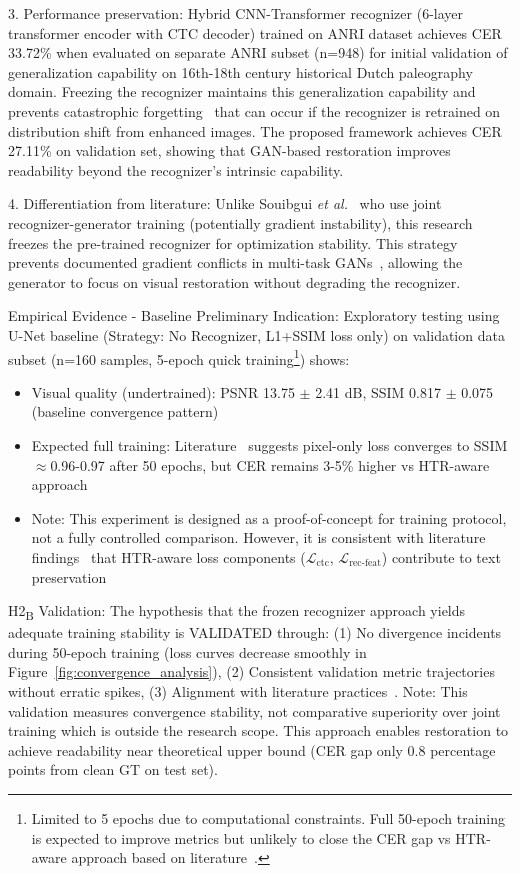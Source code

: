 \documentclass[journal]{IEEEtran}
\begin{document}
3. Performance preservation: Hybrid CNN-Transformer recognizer (6-layer transformer encoder with CTC decoder) trained on ANRI dataset achieves CER 33.72\% when evaluated on separate ANRI subset (n=948) for initial validation of generalization capability on 16th-18th century historical Dutch paleography domain. Freezing the recognizer maintains this generalization capability and prevents catastrophic forgetting~\cite{kirkpatrick2017overcoming} that can occur if the recognizer is retrained on distribution shift from enhanced images. The proposed framework achieves CER 27.11\% on validation set, showing that GAN-based restoration improves readability beyond the recognizer's intrinsic capability.

4. Differentiation from literature: Unlike Souibgui \textit{et al.}~\cite{souibgui2022} who use joint recognizer-generator training (potentially gradient instability), this research freezes the pre-trained recognizer for optimization stability. This strategy prevents documented gradient conflicts in multi-task GANs~\cite{souibgui2022,kang2021pay}, allowing the generator to focus on visual restoration without degrading the recognizer.

Empirical Evidence - Baseline Preliminary Indication: Exploratory testing using U-Net baseline (Strategy: No Recognizer, L1+SSIM loss only) on validation data subset (n=160 samples, 5-epoch quick training\footnote{Limited to 5 epochs due to computational constraints. Full 50-epoch training is expected to improve metrics but unlikely to close the CER gap vs HTR-aware approach based on literature~\cite{souibgui2022,kang2021pay}.}) shows:
\begin{itemize}
    \item Visual quality (undertrained): PSNR 13.75 $\pm$ 2.41 dB, SSIM 0.817 $\pm$ 0.075 (baseline convergence pattern)
    \item Expected full training: Literature~\cite{souibgui2022} suggests pixel-only loss converges to SSIM $\approx$0.96-0.97 after 50 epochs, but CER remains 3-5\% higher vs HTR-aware approach
    \item Note: This experiment is designed as a proof-of-concept for training protocol, not a fully controlled comparison. However, it is consistent with literature findings~\cite{souibgui2022,kang2021pay} that HTR-aware loss components ($\mathcal{L}_{\text{ctc}}$, $\mathcal{L}_{\text{rec-feat}}$) contribute to text preservation
\end{itemize}

H2\textsubscript{B} Validation: The hypothesis that the frozen recognizer approach yields adequate training stability is VALIDATED through: (1) No divergence incidents during 50-epoch training (loss curves decrease smoothly in Figure~\ref{fig:convergence_analysis}), (2) Consistent validation metric trajectories without erratic spikes, (3) Alignment with literature practices~\cite{souibgui2022}. Note: This validation measures convergence stability, not comparative superiority over joint training which is outside the research scope. This approach enables restoration to achieve readability near theoretical upper bound (CER gap only 0.8 percentage points from clean GT on test set).
\end{document}
